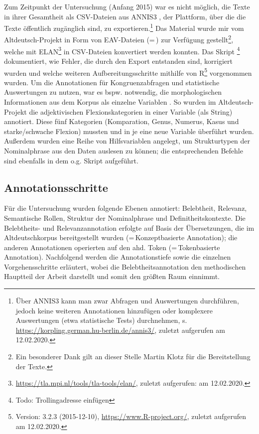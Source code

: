 Zum Zeitpunkt der Untersuchung (Anfang 2015) war es nicht möglich, die Texte in ihrer Gesamtheit als CSV-Dateien aus ANNIS3 \parencite{Krause2016}, der Plattform, über die die Texte öffentlich zugänglich sind, zu exportieren.\footnote{Über ANNIS3 kann man zwar Abfragen und Auswertungen durchführen, jedoch keine weiteren Annotationen hinzufügen oder komplexere Auswertungen (etwa statistische Tests) durchnehmen, s. \url{https://korpling.german.hu-berlin.de/annis3/}, zuletzt aufgerufen am 12.02.2020.} Das Material wurde mir vom Altdeutsch-Projekt in Form von EAV-Dateien (=\,) zur Verfügung gestellt\footnote{Ein besonderer Dank gilt an dieser Stelle Martin Klotz für die Bereitstellung der Texte.}, welche mit ELAN\footnote{\url{https://tla.mpi.nl/tools/tla-tools/elan/}, zuletzt aufgerufen: am 12.02.2020.} in CSV-Dateien konvertiert werden konnten. 
Das Skript \footnote{Todo: Trollingadresse einfügen} dokumentiert, wie Fehler, die durch den Export entstanden sind, korrigiert wurden und welche weiteren Aufbereitungsschritte mithilfe von R\footnote{Version: 3.2.3 (2015-12-10), \url{https://www.R-project.org/}, zuletzt aufgerufen am 12.02.2020.} vorgenommen wurden. 
Um die Annotationen für Kongruenzabfragen und statistische Auswertungen zu nutzen, war es bspw. notwendig, die morphologischen Informationen aus dem Korpus als einzelne Variablen . So wurden im Altdeutsch-Projekt die adjektivischen Flexionskategorien in einer Variable (als String)  annotiert. Diese fünf Kategorien (Komparation, Genus, Numerus, Kasus und starke/schwache Flexion) mussten  und in je eine neue Variable überführt wurden. Außerdem wurden eine Reihe von Hilfsvariablen angelegt, um Strukturtypen der Nominalphrase aus den Daten auslesen zu können; die entsprechenden Befehle sind ebenfalls in dem o.g. Skript aufgeführt.  

\subsection{Annotationsschritte}\label{sec:annotationsschritte}

Für die Untersuchung wurden folgende Ebenen annotiert: Belebtheit, Relevanz, Semantische Rollen, Struktur der Nominalphrase und Definitheitskontexte. Die Belebtheits- und Relevanzannotation erfolgte auf Basis der Übersetzungen, die im Altdeutschkorpus bereitgestellt wurden (=\,Konzeptbasierte Annotation); die anderen Annotationen operierten auf den ahd. Token  (=\,Tokenbasierte Annotation). Nachfolgend werden die Annotationstiefe sowie die einzelnen Vorgehensschritte erläutert, wobei die Belebtheitsannotation den methodischen Hauptteil der Arbeit darstellt und somit den größten Raum einnimmt.

